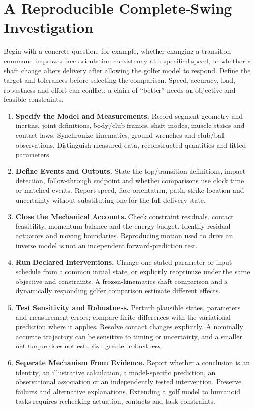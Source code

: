 \section{A Reproducible Complete-Swing Investigation}

Begin with a concrete question: for example, whether changing a transition command improves face-orientation consistency at a specified speed, or whether a shaft change alters delivery after allowing the golfer model to respond. Define the target and tolerances before selecting the comparison. Speed, accuracy, load, robustness and effort can conflict; a claim of ``better'' needs an objective and feasible constraints.

\begin{enumerate}[itemsep=3pt,topsep=4pt]
\item \textbf{Specify the Model and Measurements.} Record segment geometry and inertias, joint definitions, body/club frames, shaft modes, muscle states and contact laws. Synchronize kinematics, ground wrenches and club/ball observations. Distinguish measured data, reconstructed quantities and fitted parameters.
\item \textbf{Define Events and Outputs.} State the top/transition definitions, impact detection, follow-through endpoint and whether comparisons use clock time or matched events. Report speed, face orientation, path, strike location and uncertainty without substituting one for the full delivery state.
\item \textbf{Close the Mechanical Accounts.} Check constraint residuals, contact feasibility, momentum balance and the energy budget. Identify residual actuators and moving boundaries. Reproducing motion used to drive an inverse model is not an independent forward-prediction test.
\item \textbf{Run Declared Interventions.} Change one stated parameter or input schedule from a common initial state, or explicitly reoptimize under the same objective and constraints. A frozen-kinematics shaft comparison and a dynamically responding golfer comparison estimate different effects.
\item \textbf{Test Sensitivity and Robustness.} Perturb plausible states, parameters and measurement errors; compare finite differences with the variational prediction where it applies. Resolve contact changes explicitly. A nominally accurate trajectory can be sensitive to timing or uncertainty, and a smaller net torque does not establish greater robustness.
\item \textbf{Separate Mechanism From Evidence.} Report whether a conclusion is an identity, an illustrative calculation, a model-specific prediction, an observational association or an independently tested intervention. Preserve failures and alternative explanations. Extending a golf model to humanoid tasks requires rechecking actuation, contacts and task constraints.
\end{enumerate}

